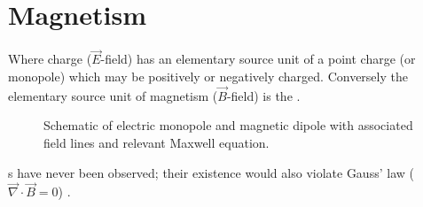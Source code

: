 \section{Magnetism}
Where charge ($\vec{E}$-field) has an elementary source unit of a point charge (or monopole) which may be positively or negatively charged. Conversely the elementary source unit of magnetism ($\vec{B}$-field) is the . 


\begin{figure}[H]
    \begin{center}
        
        \hspace{2cm}
        

    \end{center}
    \caption{Schematic of electric monopole and magnetic dipole with associated field lines and relevant Maxwell equation.}\label{fig:}
\end{figure}

s have never been observed; their existence would also violate Gauss' law ($\vec{\nabla} \cdot \vec{B} = 0 $) \cite{Jackson1998-er}. 





